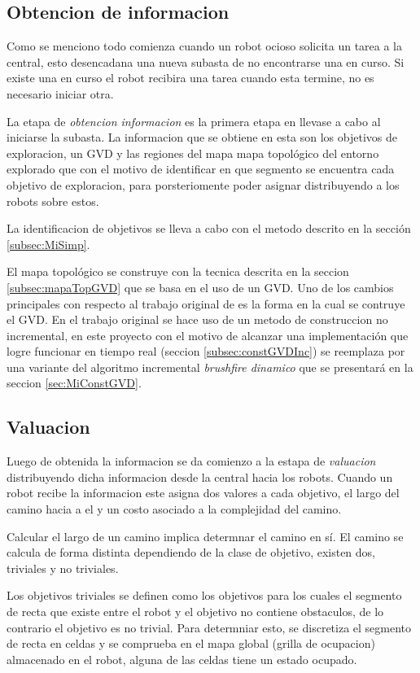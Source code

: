 \subsection{Obtencion de informacion}
Como se menciono todo comienza cuando un robot ocioso solicita un tarea a la
central, esto desencadana una nueva subasta de no encontrarse una en curso. Si
existe una en curso el robot recibira una tarea cuando esta termine, no es
necesario iniciar otra.

La etapa de \emph{obtencion informacion} es la primera etapa en llevase a cabo
al iniciarse la subasta. La informacion que se obtiene en esta son los
objetivos de exploracion, un GVD y las regiones del mapa mapa topológico del
entorno explorado que con el motivo de identificar en que segmento se encuentra
cada objetivo de exploracion, para porsteriomente poder asignar distribuyendo a
los robots sobre estos. 

La identificacion de objetivos se lleva a cabo con el metodo descrito en la
sección \ref{subsec:MiSimp}.

El mapa topológico se construye con la tecnica descrita en la seccion
\ref{subsec:mapaTopGVD} que se basa en el uso de un GVD. Uno de los cambios
principales con respecto al trabajo original de \cite{wurm2008coordinated} es
la forma en la cual se contruye el GVD. En el trabajo original se hace uso de
un metodo de construccion no incremental, en este proyecto con el motivo de
alcanzar una implementación que logre funcionar en tiempo real (seccion
\ref{subsec:constGVDInc}) se reemplaza por una variante del algoritmo
incremental \emph{brushfire dinamico} que se presentará en la seccion
\ref{sec:MiConstGVD}.


\subsection{Valuacion} \label{subsec:MiValSub}

Luego de obtenida la informacion se da comienzo a la estapa de \emph{valuacion}
distribuyendo dicha informacion desde la central hacia los robots. Cuando un
robot recibe la informacion este asigna dos valores a cada objetivo, el largo
del camino hacia a el y un costo asociado a la complejidad del camino.

Calcular el largo de un camino implica determnar el camino en sí. El camino se
calcula de forma distinta dependiendo de la clase de objetivo, existen dos,
triviales y no triviales.

Los objetivos triviales se definen como los objetivos para los cuales el
segmento de recta que existe entre el robot y el objetivo no contiene
obstaculos, de lo contrario el objetivo es no trivial. Para determniar esto, se
discretiza el segmento de recta en celdas \cite{foleyphillips} y se comprueba
en el mapa global (grilla de ocupacion) almacenado en el robot, alguna de las
celdas tiene un estado ocupado.

